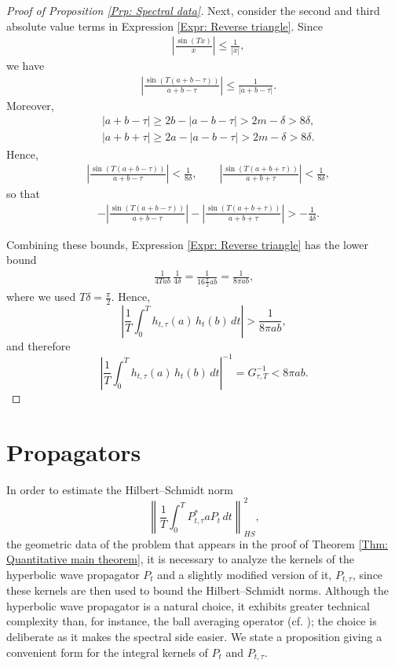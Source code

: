 \documentclass[11pt,twoside,reqno]{amsart} \usepackage{a4wide} \usepackage[T1]{fontenc} \usepackage[utf8]{inputenc} \usepackage{soul}  \usepackage{amsmath} \usepackage{amsfonts} \usepackage{amssymb} \usepackage{mathtools} \usepackage{amsthm} \usepackage{xcolor} \usepackage{graphicx} \usepackage{hyperref} \usepackage{standalone} \usepackage{esint} \usepackage{comment} \usepackage[left=2.3cm,top=3cm,right=2.3cm]{geometry} \usepackage{bm} \usepackage{svg} \usepackage{float} \numberwithin{equation}{section} \theoremstyle{plain} \newtheorem{thm}{Theorem}[section] \newtheorem{theorem}[thm]{Theorem} \newtheorem*{theorem*}{Theorem}\newtheorem{conj}[thm]{Conjecture} \newtheorem{lemma}[thm]{Lemma} \newtheorem{prop}[thm]{Proposition} \newtheorem{proposition}[thm]{Proposition} \newtheorem{cor}[thm]{Corollary} \newtheorem{question}[thm]{Question} \newtheorem{corollary}[thm]{Corollary} \newtheorem{assumption}[thm]{Assumption} \theoremstyle{definition} \newtheorem{defn}[thm]{Definition} \newtheorem{choice}[thm]{Choice} \newtheorem{definition}[thm]{Definition} \newtheorem{ex}[thm]{Example} \newtheorem{notation}[thm]{Notation} \newtheorem*{ack}{Acknowledgements} \theoremstyle{remark} \newtheorem{remark}[thm]{Remark} \newtheorem{bigremark}[thm]{Remark} \usepackage{xcolor} \newcommand{\red}[1]{ {\color{Red}#1} } \newcommand{\blue}[1]{ {\color{Blue}#1} } \author{Kai Hippi} \address{Aalto University, Espoo, Finland} \email{kai.hippi@aalto.fi}
\begin{document}
\begin{proof}[Proof of Proposition \ref{Prp: Spectral data}]
Next, consider the second and third absolute value terms in Expression \eqref{Expr: Reverse triangle}. Since
\begin{align*}
	&
	\left| \frac{ \sin( Tx ) }{x} \right| \leq \frac{1}{| x |},
\end{align*}
we have
\begin{align*}
	&
	\left|\frac{ \sin( T( a + b - \tau ) ) }{ a + b - \tau } \right| \leq \frac{1}{ | a + b - \tau | }.
\end{align*}
Moreover,
\begin{align*}
	&
	| a + b - \tau | \geq 2b - | a - b - \tau | > 2m - \delta > 8 \delta,
	\\
	&
	| a + b + \tau | \geq 2a - | a - b - \tau | > 2m - \delta > 8 \delta.
\end{align*}
Hence,
\begin{align*}
	&
	\left|\frac{ \sin( T( a + b - \tau ) ) }{ a + b - \tau } \right| < \frac{1}{8 \delta}, \qquad
	\left|\frac{ \sin( T( a + b + \tau ) ) }{ a + b + \tau } \right| < \frac{1}{8 \delta},
\end{align*}
so that
\begin{align*}
	&
	-
\left| \frac{\sin(T(a + b - \tau))}{a + b - \tau} \right|
-
\left| \frac{\sin(T(a + b + \tau))}{a + b + \tau} \right| > - \frac{1}{4 \delta}.
\end{align*}

Combining these bounds, Expression \eqref{Expr: Reverse triangle} has the lower bound
\begin{align*}
\frac{1}{4Tab}\,\frac{1}{4\delta}
= \frac{1}{16\frac{\pi}{2}ab}
= \frac{1}{8\pi ab},
\end{align*}
where we used \(T\delta=\frac{\pi}{2}\). Hence,
$$
\left| \frac{1}{T}\int_0^T h_{t,\tau}(a)\, h_t(b)\, dt \right|
 > 
\frac{1}{8\pi ab},
$$
and therefore
$$
\left| \frac{1}{T}\int_0^T h_{t,\tau}(a)\, h_t(b)\, dt \right|^{-1} = G_{\tau,T}^{-1} < 8 \pi a b.
$$
\end{proof}




\section{Propagators}
\label{Sec: Propagators}

\noindent
In order to estimate the Hilbert–Schmidt norm
$$
\left\| \frac{1}{T} \int_0^T P_{t,\tau}^{*} a P_t \, dt \right\|_{HS}^2,
$$
the geometric data of the problem that appears in the proof of Theorem \ref{Thm: Quantitative main theorem}, it is necessary to analyze the kernels of the hyperbolic wave propagator $P_t$ and a slightly modified version of it, $P_{t,\tau}$, since these kernels are then used to bound the Hilbert–Schmidt norms. Although the hyperbolic wave propagator is a natural choice, it exhibits greater technical complexity than, for instance, the ball averaging operator (cf. \cite{LS17}); the choice is deliberate as it makes the spectral side easier. We state a proposition giving a convenient form for the integral kernels of $P_t$ and $P_{t,\tau}$.
\end{document}
